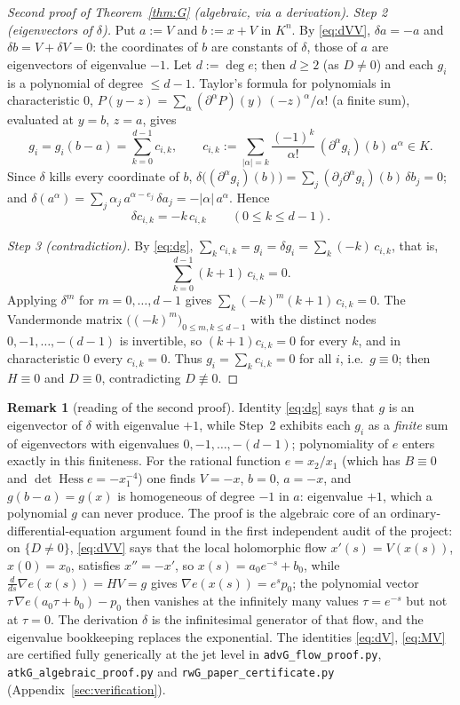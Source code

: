 \documentclass[11pt]{article}
\theoremstyle{plain}
\theoremstyle{definition}
\newtheorem{remark}[theorem]{Remark}
\newcommand{\Hess}{\operatorname{Hess}}
\begin{document}
\begin{proof}[Second proof of Theorem~\ref{thm:G} (algebraic, via a
derivation)]
\emph{Step 2 (eigenvectors of $\delta$).} Put $a:=V$ and $b:=x+V$ in
$K^n$. By \eqref{eq:dVV}, $\delta a=-a$ and $\delta b=V+\delta V=0$: the
coordinates of $b$ are constants of $\delta$, those of $a$ are
eigenvectors of eigenvalue $-1$. Let $d:=\deg e$; then $d\ge2$ (as
$D\ne0$) and each $g_i$ is a polynomial of degree $\le d-1$. Taylor's
formula for polynomials in characteristic $0$,
$P(y-z)=\sum_\alpha(\partial^\alpha P)(y)\,(-z)^\alpha/\alpha!$ (a finite
sum), evaluated at $y=b$, $z=a$, gives
\[
g_i=g_i(b-a)=\sum_{k=0}^{d-1}c_{i,k},\qquad
c_{i,k}:=\sum_{|\alpha|=k}\frac{(-1)^k}{\alpha!}\,
(\partial^\alpha g_i)(b)\,a^\alpha\in K .
\]
Since $\delta$ kills every coordinate of $b$,
$\delta\bigl((\partial^\alpha g_i)(b)\bigr)
=\sum_j(\partial_j\partial^\alpha g_i)(b)\,\delta b_j=0$; and
$\delta(a^\alpha)=\sum_j\alpha_j\,a^{\alpha-e_j}\,\delta a_j
=-|\alpha|\,a^\alpha$. Hence
\[
\delta c_{i,k}=-k\,c_{i,k}\qquad(0\le k\le d-1).
\]

\emph{Step 3 (contradiction).} By \eqref{eq:dg},
$\sum_kc_{i,k}=g_i=\delta g_i=\sum_k(-k)\,c_{i,k}$, that is,
\[
\sum_{k=0}^{d-1}(k+1)\,c_{i,k}=0 .
\]
Applying $\delta^m$ for $m=0,\dots,d-1$ gives
$\sum_k(-k)^m(k+1)\,c_{i,k}=0$. The Vandermonde matrix
$\bigl((-k)^m\bigr)_{0\le m,k\le d-1}$ with the distinct nodes
$0,-1,\dots,-(d-1)$ is invertible, so $(k+1)c_{i,k}=0$ for every $k$, and
in characteristic $0$ every $c_{i,k}=0$. Thus $g_i=\sum_kc_{i,k}=0$ for
all $i$, i.e.\ $g\equiv0$; then $H\equiv0$ and $D\equiv0$, contradicting
$D\not\equiv0$.
\end{proof}

\begin{remark}[reading of the second proof]\label{rem:flow}
Identity \eqref{eq:dg} says that $g$ is an eigenvector of $\delta$ with
eigenvalue $+1$, while Step~2 exhibits each $g_i$ as a \emph{finite} sum
of eigenvectors with eigenvalues $0,-1,\dots,-(d-1)$; polynomiality of
$e$ enters exactly in this finiteness. For the rational function
$e=x_2/x_1$ (which has $B\equiv0$ and $\det\Hess e=-x_1^{-4}$) one finds
$V=-x$, $b=0$, $a=-x$, and $g(b-a)=g(x)$ is homogeneous of degree $-1$ in
$a$: eigenvalue $+1$, which a polynomial $g$ can never produce. The proof
is the algebraic core of an ordinary-differential-equation argument found
in the first independent audit of the project: on $\{D\ne0\}$,
\eqref{eq:dVV} says that the local holomorphic flow $x'(s)=V(x(s))$,
$x(0)=x_0$, satisfies $x''=-x'$, so $x(s)=a_0e^{-s}+b_0$, while
$\frac{d}{ds}\nabla e(x(s))=HV=g$ gives $\nabla e(x(s))=e^{s}p_0$; the
polynomial vector $\tau\,\nabla e(a_0\tau+b_0)-p_0$ then vanishes at the
infinitely many values $\tau=e^{-s}$ but not at $\tau=0$. The derivation
$\delta$ is the infinitesimal generator of that flow, and the eigenvalue
bookkeeping replaces the exponential. The identities \eqref{eq:dV},
\eqref{eq:MV} are certified fully generically at the jet level in
\texttt{advG\_flow\_proof.py}, \texttt{atkG\_algebraic\_proof.py} and
\texttt{rwG\_paper\_certificate.py} (Appendix~\ref{sec:verification}).
\end{remark}
\end{document}
